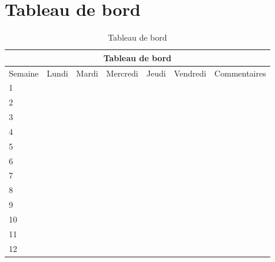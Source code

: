 \section{Tableau de bord}

\begin{table}[h]
\begin{tabular}{lllllll}
\hline
\multicolumn{7}{c}{Tableau de bord}                                  \\\hline
Semaine &\vline\hspace{1mm} Lundi &\vline\hspace{1mm} Mardi &\vline\hspace{1mm}
Mercredi &\vline\hspace{1mm} Jeudi &\vline\hspace{1mm} Vendredi &\vline\hspace{1mm} Commentaires \\\hline
1       &       &       &          &       &          &              \\\hline
2       &       &       &          &       &          &              \\\hline
3       &       &       &          &       &          &              \\\hline
4       &       &       &          &       &          &              \\\hline
5       &       &       &          &       &          &              \\\hline
6       &       &       &          &       &          &              \\\hline
7       &       &       &          &       &          &              \\\hline
8       &       &       &          &       &          &              \\\hline
9       &       &       &          &       &          &              \\\hline
10      &       &       &          &       &          &              \\\hline
11      &       &       &          &       &          &              \\\hline
12      &       &       &          &       &          &             
\end{tabular}
\caption{Tableau de bord}
\centering
\end{table}
